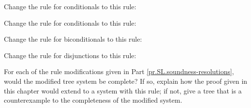 \begin{earg}
\item Change the rule for conditionals to this rule:

\item Change the rule for conditionals to this rule:

\item Change the rule for biconditionals to this rule:

\item Change the rule for disjunctions to this rule:

\end{earg}

\problempart
\label{pr.SL.completenessresolutions}
For each of the rule modifications given in Part \ref{pr.SL.soundness-resolutions}, would the modified tree system be complete? If so, explain how the proof given in this chapter would extend to a system with this rule; if not, give a tree that is a counterexample to the completeness of the modified system.
